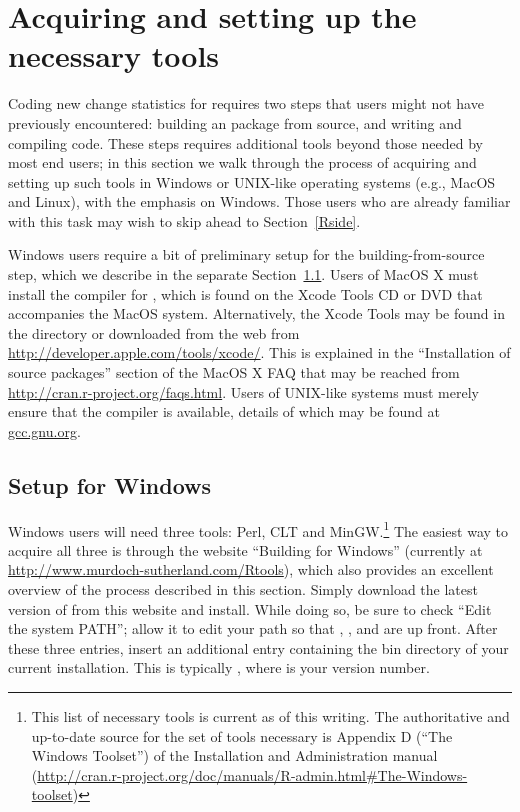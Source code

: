 \documentclass[nojss]{jss}
\begin{document}
\section{Acquiring and setting up the necessary tools}
\label{Tools}

Coding new change statistics for  requires two steps that users might
not have previously encountered: building an  package from source,
and writing and compiling  code. These steps requires additional
tools beyond those needed by most  end users; in this section we
walk through the process of acquiring and setting up such tools in Windows or
UNIX-like operating systems (e.g., MacOS and Linux), with the emphasis on
Windows. 
Those users who are already familiar with this task may wish to skip ahead to
Section~\ref{Rside}.

Windows users require a bit of preliminary setup for the building-from-source
step, which we describe in the separate Section~\ref{AcqTools}.  Users of MacOS X
must install the 
compiler for , which is found on the Xcode Tools CD or
DVD that accompanies the MacOS system.  Alternatively, the Xcode Tools may
be found in the  directory or downloaded from the
web from \url{http://developer.apple.com/tools/xcode/}.  This is explained in the 
``Installation of source packages'' section of the
 MacOS X FAQ that may be reached from
\url{http://cran.r-project.org/faqs.html}.  Users of UNIX-like systems must merely
ensure that the  compiler is available, details of which may be
found at \url{gcc.gnu.org}.

\subsection{Setup for Windows}
\label{AcqTools}

Windows users will need three tools: Perl, CLT and MinGW.\footnote{This list of
necessary tools is current as of this writing. The authoritative and up-to-date
source for the set of tools necessary is Appendix D (``The Windows Toolset'') of
the  Installation and Administration manual
(\url{http://cran.r-project.org/doc/manuals/R-admin.html\#The-Windows-toolset})}
The easiest way to acquire all three is through the website ``Building
 for Windows'' (currently at
\url{http://www.murdoch-sutherland.com/Rtools}), which also provides an
excellent overview of the process described in this section. Simply download the
latest version of  from this website and install.  While 
doing so, be sure to check ``Edit the system PATH''; allow it to edit your path
so that , , and  are up front. After these three
entries, insert an additional entry containing the bin directory of your current
 installation. This is typically , where  is
your  version number.
\end{document}
